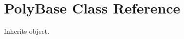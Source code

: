 \hypertarget{classpyneb_1_1utils_1_1polyutils_1_1_poly_base}{}\section{Poly\+Base Class Reference}
\label{classpyneb_1_1utils_1_1polyutils_1_1_poly_base}


Inherits object.

